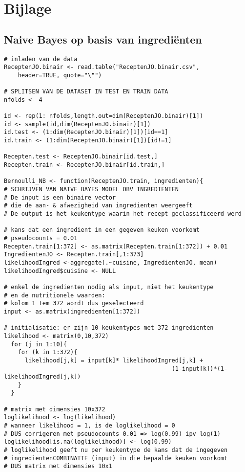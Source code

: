 
\appendix
\chapter{Bijlage}
\iffalse
\section{Naive Bayes op basis van ingredi\"{e}nten }
\begin{lstlisting}
# inladen van de data
ReceptenJO.binair <- read.table("ReceptenJO.binair.csv", 
	header=TRUE, quote="\"")

# SPLITSEN VAN DE DATASET IN TEST EN TRAIN DATA
nfolds <- 4

id <- rep(1: nfolds,length.out=dim(ReceptenJO.binair)[1])
id <- sample(id,dim(ReceptenJO.binair)[1])
id.test <- (1:dim(ReceptenJO.binair)[1])[id==1]
id.train <- (1:dim(ReceptenJO.binair)[1])[id!=1]

Recepten.test <- ReceptenJO.binair[id.test,]
Recepten.train <- ReceptenJO.binair[id.train,] 

Bernoulli_NB <- function(ReceptenJO.train, ingredienten){
# SCHRIJVEN VAN NAIVE BAYES MODEL OBV INGREDIENTEN
# De input is een binaire vector 
# die de aan- & afwezigheid van ingredienten weergeeft
# De output is het keukentype waarin het recept geclassificeerd werd
  
# kans dat een ingredient in een gegeven keuken voorkomt
# pseudocounts = 0.01
Recepten.train[1:372] <- as.matrix(Recepten.train[1:372]) + 0.01 
IngredientenJO <- Recepten.train[,1:373] 
likelihoodIngred <-aggregate(.~cuisine, IngredientenJO, mean)
likelihoodIngred$cuisine <- NULL

# enkel de ingredienten nodig als input, niet het keukentype
# en de nutritionele waarden: 
# kolom 1 tem 372 wordt dus geselecteerd
input <- as.matrix(ingredienten[1:372]) 

# initialisatie: er zijn 10 keukentypes met 372 ingredienten    
likelihood <- matrix(0,10,372) 
  for (j in 1:10){
    for (k in 1:372){
      likelihood[j,k] = input[k]* likelihoodIngred[j,k] + 
												(1-input[k])*(1-likelihoodIngred[j,k])
    }
  }
	
# matrix met dimensies 10x372
loglikelihood <- log(likelihood)
# wanneer likelihood = 1, is de loglikelihood = 0
# DUS corrigeren met pseudocounts 0.01 => log(0.99) ipv log(1)
loglikelihood[is.na(loglikelihood)] <- log(0.99) 
# loglikelihood geeft nu per keukentype de kans dat de ingegeven
# ingredientenCOMBINATIE (input) in die bepaalde keuken voorkomt 
# DUS matrix met dimensies 10x1
  

\end{lstlisting}
